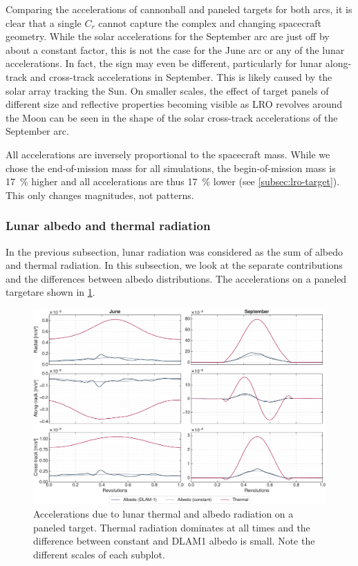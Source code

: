Comparing the accelerations of cannonball and paneled targets for both arcs, it is clear that a single $C_r$ cannot capture the complex and changing spacecraft geometry. While the solar accelerations for the September arc are just off by about a constant factor, this is not the case for the June arc or any of the lunar accelerations. In fact, the sign may even be different, particularly for lunar along-track and cross-track accelerations in September. This is likely caused by the solar array tracking the Sun. On smaller scales, the effect of target panels of different size and reflective properties becoming visible as \gls{LRO} revolves around the Moon can be seen in the shape of the solar cross-track accelerations of the September arc.

All accelerations are inversely proportional to the spacecraft mass. While we chose the end-of-mission mass for all simulations, the begin-of-mission mass is \qty{17}{\percent} higher and all accelerations are thus \qty{17}{\percent} lower (see \cref{subsec:lro-target}). This only changes magnitudes, not patterns.





\subsubsection{Lunar albedo and thermal radiation}
In the previous subsection, lunar radiation was considered as the sum of albedo and thermal radiation. In this subsection, we look at the separate contributions and the differences between albedo distributions. The accelerations on a paneled targetare shown in \cref{fig:acc-albedovsthermal}.

\begin{figure}[t]
    \centering
    \includegraphics[width=\textwidth]{figures/plots/acc_albedovsthermal.pdf}

    \caption{Accelerations due to lunar thermal and albedo radiation on a paneled target. Thermal radiation dominates at all times and the difference between constant and \gls{DLAM1} albedo is small. Note the different scales of each subplot.}
    \label{fig:acc-albedovsthermal}
\end{figure}

